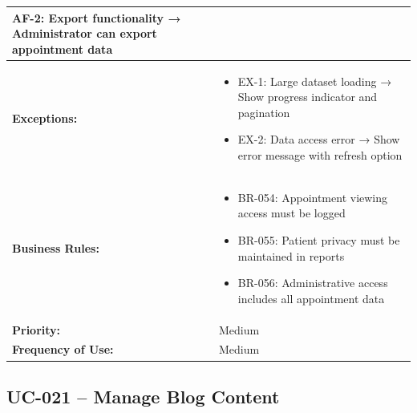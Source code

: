 \documentclass[12pt,a4paper]{article}
\begin{document}
\begin{longtable}{|p{4.5cm}|p{10.5cm}|}
\textbf{AF-2:} Export functionality → Administrator can export appointment data \\
\hline
\textbf{Exceptions:} &
\begin{itemize}
  \item EX-1: Large dataset loading → Show progress indicator and pagination
  \item EX-2: Data access error → Show error message with refresh option
\end{itemize} \\
\hline
\textbf{Business Rules:} &
\begin{itemize}
  \item BR-054: Appointment viewing access must be logged
  \item BR-055: Patient privacy must be maintained in reports
  \item BR-056: Administrative access includes all appointment data
\end{itemize} \\
\hline
\textbf{Priority:} & Medium \\
\hline
\textbf{Frequency of Use:} & Medium \\
\hline
\end{longtable}

\subsection{UC-021 – Manage Blog Content}
\end{document}
